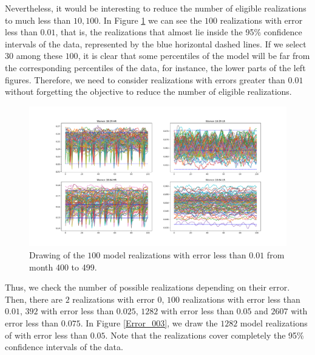 Nevertheless, it would be interesting to reduce the number of eligible realizations to much less than $10,100$. In Figure \ref{Error_0} we can see the $100$ realizations with error less than $0.01$, that is, the realizations that almost lie inside the 95\% confidence intervals of the data, represented by the blue horizontal dashed lines. If we select $30$ among these $100$, it is clear that some percentiles of the model will be far from the corresponding percentiles of the data, for instance, the lower parts of the left figures. Therefore, we need to consider realizations with errors greater than $0.01$ without forgetting the objective to reduce the number of eligible realizations.  

\begin{figure}[h!]
	\centering
	\includegraphics[width=\linewidth]{IMGs/1.-Calibrado/Error_001.pdf}
	\caption{Drawing of the $100$ model realizations with error less than $0.01$ from month 400 to 499. }
	\label{Error_0}
\end{figure}

Thus, we check the number of possible realizations depending on their error. Then, there are $2$ realizations with error $0$,  $100$ realizations with error less than $0.01$, $392$ with error less than $0.025$, $1282$ with error less than $0.05$ and $2607$ with error less than $0.075$. In Figure \ref{Error_003}, we draw the $1282$ model realizations of with error less than $0.05$. Note that the realizations cover completely the 95\% confidence intervals of the data. 

